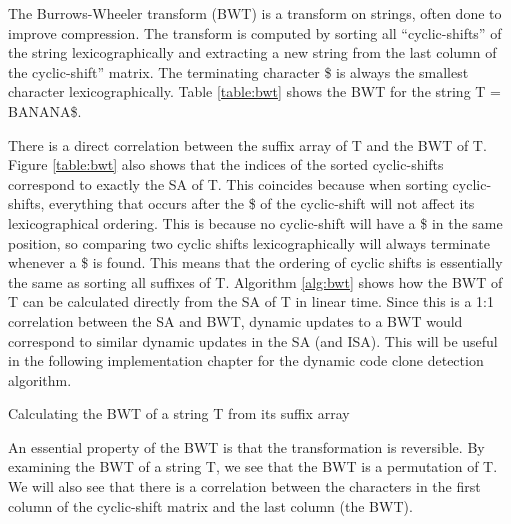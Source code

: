 
The Burrows-Wheeler transform (BWT) is a transform on strings, often done to improve
compression. The transform is computed by sorting all ``cyclic-shifts'' of the string
lexicographically and extracting a new string from the last column of the cyclic-shift''
matrix. The terminating character \$ is always the smallest character lexicographically.
Table \ref{table:bwt} shows the BWT for the string T = BANANA\$.

There is a direct correlation between the suffix array of T and the BWT of T. Figure
\ref{table:bwt} also shows that the indices of the sorted cyclic-shifts correspond to
exactly the SA of T. This coincides because when sorting cyclic-shifts, everything that
occurs after the \$ of the cyclic-shift will not affect its lexicographical ordering. This
is because no cyclic-shift will have a \$ in the same position, so comparing two cyclic
shifts lexicographically will always terminate whenever a \$ is found. This means that the
ordering of cyclic shifts is essentially the same as sorting all suffixes of T. Algorithm
\ref{alg:bwt} shows how the BWT of T can be calculated directly from the SA of T in linear
time. Since this is a 1:1 correlation between the SA and BWT, dynamic updates to a BWT
would correspond to similar dynamic updates in the SA (and ISA). This will be useful in
the following implementation chapter for the dynamic code clone detection algorithm.

\begin{algorithm}[htp]
  \SetAlgoLined\DontPrintSemicolon

  \vspace{0.5cm}
  \caption{Calculating the BWT of a string T from its suffix array}
  \label{alg:bwt}
\end{algorithm}


An essential property of the BWT is that the transformation is reversible. By examining
the BWT of a string T, we see that the BWT is a permutation of T. We will also see that
there is a correlation between the characters in the first column of the cyclic-shift
matrix and the last column (the BWT).

